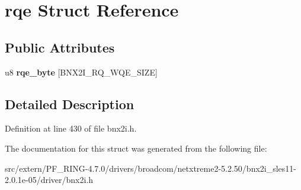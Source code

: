 \hypertarget{structrqe}{
\section{rqe Struct Reference}
\label{structrqe}
}
\subsection*{Public Attributes}
\begin{DoxyCompactItemize}
\item 
\hypertarget{structrqe_a353f168c5892e7bf28699c6a60372dfc}{
u8 {\bfseries rqe\_\-byte} \mbox{[}BNX2I\_\-RQ\_\-WQE\_\-SIZE\mbox{]}}
\label{structrqe_a353f168c5892e7bf28699c6a60372dfc}

\end{DoxyCompactItemize}


\subsection{Detailed Description}


Definition at line 430 of file bnx2i.h.



The documentation for this struct was generated from the following file:\begin{DoxyCompactItemize}
\item 
src/extern/PF\_\-RING-\/4.7.0/drivers/broadcom/netxtreme2-\/5.2.50/bnx2i\_\-sles11-\/2.0.1e-\/05/driver/bnx2i.h\end{DoxyCompactItemize}
